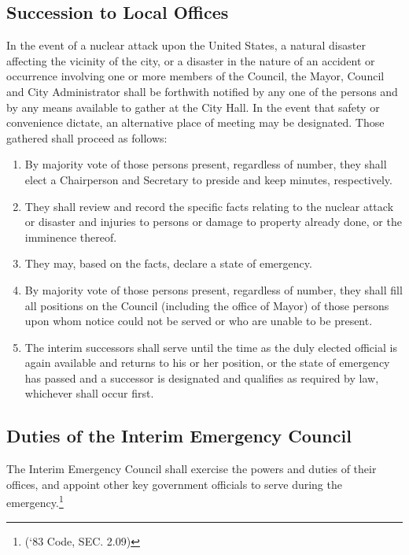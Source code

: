 \subsection{Succession to Local Offices}
In the event of a nuclear attack upon the United States, a natural disaster affecting the vicinity of the city, or a disaster in the nature of an accident or occurrence involving one or more members of the Council, the Mayor, Council and City Administrator shall be forthwith notified by any one of the persons and by any means available to gather at the City Hall.  In the event that safety or convenience dictate, an alternative place of meeting may be designated.  Those gathered shall proceed as follows:
\begin{enumerate}[{\indent}1)]
    \item By majority vote of those persons present, regardless of number, they shall elect a Chairperson and Secretary to preside and keep minutes, respectively.
    \item They shall review and record the specific facts relating to the nuclear attack or disaster and injuries to persons or damage to property already done, or the imminence thereof.
    \item They may, based on the facts, declare a state of emergency.
    \item By majority vote of those persons present, regardless of number, they shall fill all positions on the Council (including the office of Mayor) of those persons upon whom notice could not be served or who are unable to be present.
    \item The interim successors shall serve until the time as the duly elected official is again available and returns to his or her position, or the state of emergency has passed and a successor is designated and qualifies as required by law, whichever shall occur first.
\end{enumerate}
\subsection{Duties of the Interim Emergency Council}
The Interim Emergency Council shall exercise the powers and duties of their offices, and appoint other key government officials to serve during the emergency.\footnote{(‘83 Code, SEC. 2.09)}
